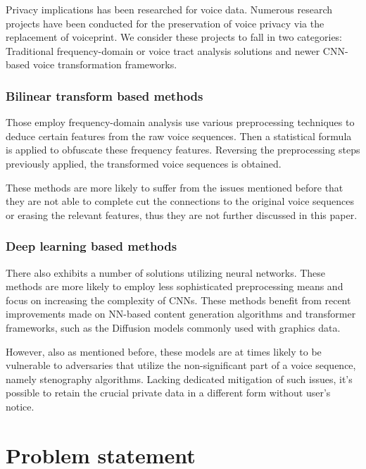 \documentclass[conference]{IEEEtran}
\begin{document}
Privacy implications has been researched for voice data\cite{priv_spk_char, priv_impl_vaa}. Numerous research projects have been conducted for the preservation of voice privacy via the replacement of voiceprint. We consider these projects to fall in two categories: Traditional frequency-domain or voice tract analysis solutions and newer CNN-based voice transformation frameworks.

\subsubsection{Bilinear transform based methods}

Those employ frequency-domain analysis use various preprocessing techniques to deduce certain features from the raw voice sequences. Then a statistical formula is applied to obfuscate these frequency features. Reversing the preprocessing steps previously applied, the transformed voice sequences is obtained.\cite{a9, a10, a11}

These methods are more likely to suffer from the issues mentioned before that they are not able to complete cut the connections to the original voice sequences or erasing the relevant features, thus they are not further discussed in this paper.

\subsubsection{Deep learning based methods}

There also exhibits a number of solutions utilizing neural networks. These methods are more likely to employ less sophisticated preprocessing means and focus on increasing the complexity of CNNs. These methods benefit from recent improvements made on NN-based content generation algorithms and transformer frameworks, such as the Diffusion models commonly used with graphics data.\cite{a8}

However, also as mentioned before, these models are at times likely to be vulnerable to adversaries that utilize the non-significant part of a voice sequence, namely stenography algorithms. Lacking dedicated mitigation of such issues, it's possible to retain the crucial private data in a different form without user's notice.

\section{Problem statement}
\label{seg:problem}
\end{document}
